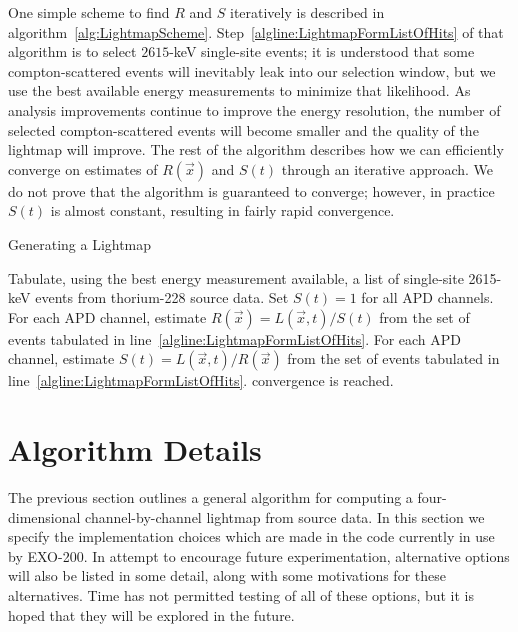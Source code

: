 One simple scheme to find $R$ and $S$ iteratively is described in algorithm~\ref{alg:LightmapScheme}.  Step~\ref{algline:LightmapFormListOfHits} of that algorithm is to select $2615$-keV single-site events; it is understood that some compton-scattered events will inevitably leak into our selection window, but we use the best available energy measurements to minimize that likelihood. As analysis improvements continue to improve the energy resolution, the number of selected compton-scattered events will become smaller and the quality of the lightmap will improve.  The rest of the algorithm describes how we can efficiently converge on estimates of $R(\vec{x})$ and $S(t)$ through an iterative approach.  We do not prove that the algorithm is guaranteed to converge; however, in practice $S(t)$ is almost constant, resulting in fairly rapid convergence.

\begin{algorithm}
\caption{Generating a Lightmap}
\label{alg:LightmapScheme}
\begin{algorithmic}[1]
\STATE Tabulate, using the best energy measurement available, a list of single-site 2615-keV events from thorium-228 source data. \label{algline:LightmapFormListOfHits}
\STATE Set $S(t) = 1$ for all APD channels.
\REPEAT
  \STATE For each APD channel, estimate $R(\vec{x}) = L(\vec{x},t)/S(t)$ from the set of events tabulated in line~\ref{algline:LightmapFormListOfHits}.
  \STATE For each APD channel, estimate $S(t) = L(\vec{x},t)/R(\vec{x})$ from the set of events tabulated in line~\ref{algline:LightmapFormListOfHits}.
\UNTIL convergence is reached.
\end{algorithmic}
\end{algorithm}


\section{Algorithm Details}

The previous section outlines a general algorithm for computing a four-dimensional channel-by-channel lightmap from source data.  In this section we specify the implementation choices which are made in the code currently in use by EXO-200.  In attempt to encourage future experimentation, alternative options will also be listed in some detail, along with some motivations for these alternatives.  Time has not permitted testing of all of these options, but it is hoped that they will be explored in the future.

